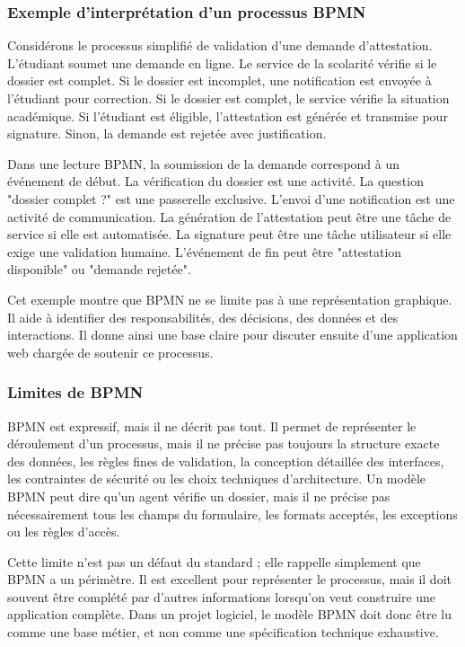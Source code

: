 \subsubsection{Exemple d'interprétation d'un processus BPMN}

Considérons le processus simplifié de validation d'une demande d'attestation. L'étudiant soumet une demande en ligne. Le service de la scolarité vérifie si le dossier est complet. Si le dossier est incomplet, une notification est envoyée à l'étudiant pour correction. Si le dossier est complet, le service vérifie la situation académique. Si l'étudiant est éligible, l'attestation est générée et transmise pour signature. Sinon, la demande est rejetée avec justification.

Dans une lecture BPMN, la soumission de la demande correspond à un événement de début. La vérification du dossier est une activité. La question "dossier complet ?" est une passerelle exclusive. L'envoi d'une notification est une activité de communication. La génération de l'attestation peut être une tâche de service si elle est automatisée. La signature peut être une tâche utilisateur si elle exige une validation humaine. L'événement de fin peut être "attestation disponible" ou "demande rejetée".

Cet exemple montre que BPMN ne se limite pas à une représentation graphique. Il aide à identifier des responsabilités, des décisions, des données et des interactions. Il donne ainsi une base claire pour discuter ensuite d'une application web chargée de soutenir ce processus.

\subsubsection{Limites de BPMN}

BPMN est expressif, mais il ne décrit pas tout. Il permet de représenter le déroulement d'un processus, mais il ne précise pas toujours la structure exacte des données, les règles fines de validation, la conception détaillée des interfaces, les contraintes de sécurité ou les choix techniques d'architecture. Un modèle BPMN peut dire qu'un agent vérifie un dossier, mais il ne précise pas nécessairement tous les champs du formulaire, les formats acceptés, les exceptions ou les règles d'accès.

Cette limite n'est pas un défaut du standard ; elle rappelle simplement que BPMN a un périmètre. Il est excellent pour représenter le processus, mais il doit souvent être complété par d'autres informations lorsqu'on veut construire une application complète. Dans un projet logiciel, le modèle BPMN doit donc être lu comme une base métier, et non comme une spécification technique exhaustive.

